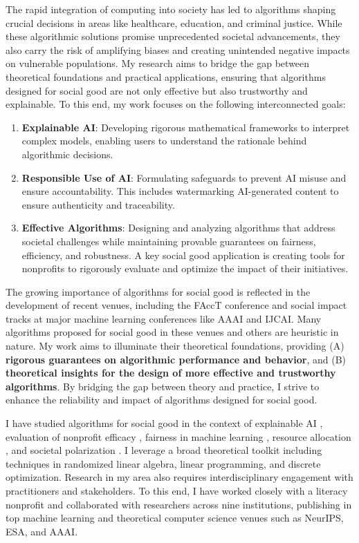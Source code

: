 \documentclass[11pt]{article}
\begin{document}
{\setlength{\parindent}{0cm}

The rapid integration of computing into society has led to algorithms shaping crucial decisions in areas like healthcare, education, and criminal justice. While these algorithmic solutions promise unprecedented societal advancements, they also carry the risk of amplifying biases and creating unintended negative impacts on vulnerable populations. My research aims to bridge the gap between theoretical foundations and practical applications, ensuring that algorithms designed for social good are not only effective but also trustworthy and explainable. 
To this end, my work focuses on the following interconnected goals:
\begin{enumerate}
    \item \textbf{Explainable AI}: Developing rigorous mathematical frameworks to interpret complex models, enabling users to understand the rationale behind algorithmic decisions.
    \item \textbf{Responsible Use of AI}: Formulating safeguards to prevent AI misuse and ensure accountability. This includes watermarking AI-generated content to ensure authenticity and traceability.
    \item \textbf{Effective Algorithms}: Designing and analyzing algorithms that address societal challenges while maintaining provable guarantees on fairness, efficiency, and robustness. A key social good application is creating tools for nonprofits to rigorously evaluate and optimize the impact of their initiatives.
\end{enumerate}

The growing importance of algorithms for social good is reflected in the development of recent venues, including the FAccT conference and social impact tracks at major machine learning conferences like AAAI and IJCAI.
Many algorithms proposed for social good in these venues and others are heuristic in nature. My work aims to illuminate their theoretical foundations, providing (A) \textbf{rigorous guarantees on algorithmic performance and behavior}, and (B) \textbf{theoretical insights for the design of more effective and trustworthy algorithms}.
By bridging the gap between theory and practice, I strive to enhance the reliability and impact of algorithms designed for social good.

I have studied algorithms for social good in the context of explainable AI \cite{musco2024leverage,liu2024kernel}, evaluation of nonprofit efficacy \cite{witter2024benchmarking}, fairness in machine learning \cite{rosenblatt2023counterfactual,witter2024fairlyuncertain}, resource allocation \cite{hellerstein2022local,witter2024i,witter2024minimizing}, and societal polarization \cite{musco2022quantify}. I leverage a broad theoretical toolkit including techniques in randomized linear algebra, linear programming, and discrete optimization. Research in my area also requires interdisciplinary engagement with practitioners and stakeholders. To this end, I have worked closely with a literacy nonprofit and collaborated with researchers across nine institutions, publishing in top machine learning and theoretical computer science venues such as NeurIPS, ESA, and AAAI.

}
\end{document}
